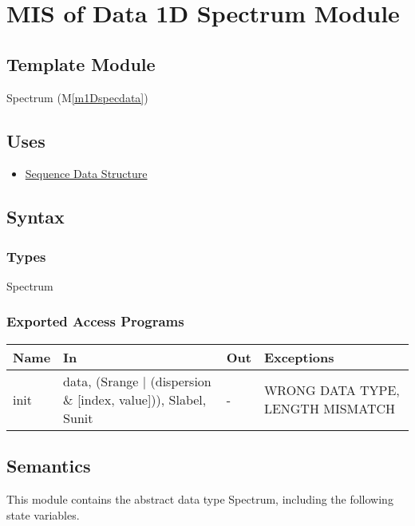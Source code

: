 \documentclass[12pt, titlepage]{article}
\newcommand{\mref}[1]{M\ref{#1}}
\begin{document}
\newpage
\section{MIS of Data 1D Spectrum Module} \label{Mod:Spectrum}
\subsection{Template Module}
Spectrum (\mref{m1Dspecdata})

\subsection{Uses}
\begin{itemize}
    \item \hyperref[Mod:Seq]{Sequence Data Structure}
\end{itemize}

\subsection{Syntax}

\subsubsection{Types}
Spectrum

\subsubsection{Exported Access Programs}

\begin{center}
    \begin{tabular}{p{1.5cm} p{4cm} p{4cm} p{4cm}}
        \toprule
        \textbf{Name} & \textbf{In} & \textbf{Out} & \textbf{Exceptions} \\
        \midrule
        init & data, (Srange $|$ (dispersion $\&$ [index, value])), Slabel, Sunit & - &
        WRONG DATA TYPE, LENGTH MISMATCH \\
        \bottomrule
    \end{tabular}
\end{center}

\subsection{Semantics}
This module contains the abstract data type Spectrum, including the following
state variables.
\end{document}
